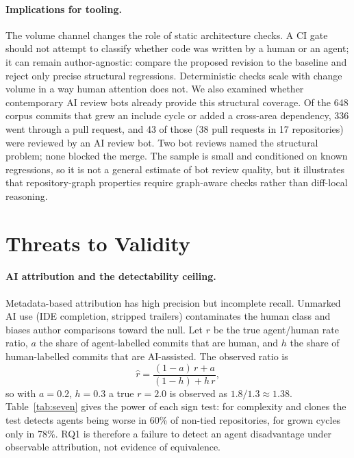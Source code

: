 \documentclass[sigplan,11pt,nonacm=true]{acmart}
\begin{document}
\paragraph{Implications for tooling.} The volume channel changes the role of
static architecture checks. A CI gate should not attempt to classify whether
code was written by a human or an agent; it can remain author-agnostic:
compare the proposed revision to the baseline and reject only precise
structural regressions. Deterministic checks scale with change volume in a way
human attention does not. We also examined whether contemporary AI review bots
already provide this structural coverage. Of the 648 corpus commits that grew
an include cycle or added a cross-area dependency, 336 went through a pull
request, and 43 of those (38 pull requests in 17 repositories) were reviewed
by an AI review bot. Two bot reviews named the structural problem; none
blocked the merge. The sample is small and
conditioned on known regressions, so it is not a general estimate of bot
review quality, but it illustrates that repository-graph properties require
graph-aware checks rather than diff-local reasoning.

\section{Threats to Validity}
\label{sec:threats}

\paragraph{AI attribution and the detectability ceiling.} Metadata-based
attribution has high precision but incomplete recall. Unmarked AI use (IDE
completion, stripped trailers) contaminates the human class and biases author
comparisons toward the null. Let $r$ be the true agent/human rate ratio, $a$
the share of agent-labelled commits that are human, and $h$ the share of
human-labelled commits that are AI-assisted. The observed ratio is
\[
  \hat r = \frac{(1-a)\,r + a}{(1-h) + h\,r},
\]
so with $a=0.2$, $h=0.3$ a true $r=2.0$ is observed as $1.8/1.3 \approx 1.38$.
Table~\ref{tab:seven} gives the power of each sign test: for complexity and
clones the test detects agents being worse in 60\% of non-tied repositories,
for grown cycles only in 78\%. RQ1 is therefore a failure to detect an agent
disadvantage under observable attribution, not evidence of equivalence.
\end{document}
